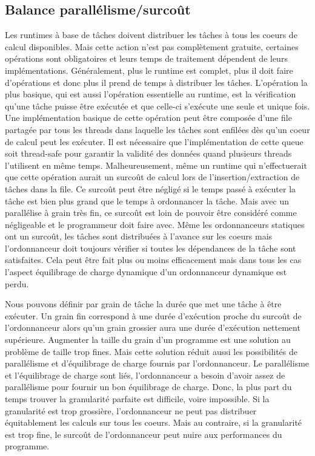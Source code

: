 \subsection{Balance parallélisme/surcoût}
Les runtimes à base de tâches doivent distribuer les tâches à tous les coeurs de calcul disponibles.
%
Mais cette action n'est pas complètement gratuite, certaines opérations sont obligatoires et leurs temps de traitement dépendent de leurs implémentations.
%
Généralement, plus le runtime est complet, plus il doit faire d'opérations et donc plus il prend de temps à distribuer les tâches.
%
L'opération la plus basique, qui est aussi l'opération essentielle au runtime, est la vérification qu'une tâche puisse être exécutée et que celle-ci s'exécute une seule et unique fois.
%
Une implémentation basique de cette opération peut être composée d'une file partagée par tous les threads dans laquelle les tâches sont enfilées dès qu'un coeur de calcul peut les exécuter.
%
Il est nécessaire que l'implémentation de cette queue soit thread-safe pour garantir la validité des données quand plusieurs threads l'utilisent en même temps.
%
Malheureusement, même un runtime qui n'effectuerait que cette opération aurait un surcoût de calcul lors de l'insertion/extraction de tâches dans la file.
%
Ce surcoût peut être négligé si le temps passé à exécuter la tâche est bien plus grand que le temps à ordonnancer la tâche.
%
Mais avec un parallélise à grain très fin, ce surcoût est loin de pouvoir être considéré comme négligeable et le programmeur doit faire avec.
%
Même les ordonnanceurs statiques ont un surcoût, les tâches sont distribuées à l'avance sur les coeurs mais l'ordonnanceur doit toujours vérifier si toutes les dépendances de la tâche sont satisfaites.
%
Cela peut être fait plus ou moins efficacement mais dans tous les cas l'aspect équilibrage de charge dynamique d'un ordonnanceur dynamique est perdu.


Nous pouvons définir par grain de tâche la durée que met une tâche à être exécuter.
%
Un grain fin correspond à une durée d'exécution proche du surcoût de l'ordonnanceur alors qu'un grain grossier aura une durée d'exécution nettement supérieure.
%
Augmenter la taille du grain d'un programme est une solution au problème de taille trop fines.
%
Mais cette solution réduit aussi les possibilités de parallélisme et d'équilibrage de charge fournis par l'ordonnanceur.
%
Le parallélisme et l'équilibrage de charge sont liés, l'ordonnanceur a besoin d'avoir assez de parallélisme pour fournir un bon équilibrage de charge.
%
Donc, la plus part du temps trouver la granularité parfaite est difficile, voire impossible.
%
Si la granularité est trop grossière, l'ordonnanceur ne peut pas distribuer équitablement les calculs sur tous les coeurs.
%
Mais au contraire, si la granularité est trop fine, le surcoût de l'ordonnanceur peut nuire aux performances du programme.


